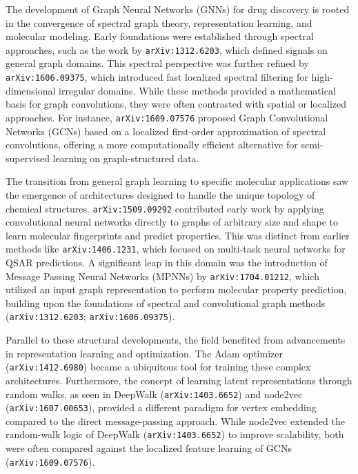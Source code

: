 \documentclass[11pt]{article}
\begin{document}
The development of Graph Neural Networks (GNNs) for drug discovery is rooted in the convergence of spectral graph theory, representation learning, and molecular modeling. Early foundations were established through spectral approaches, such as the work by \texttt{arXiv:1312.6203}, which defined signals on general graph domains. This spectral perspective was further refined by \texttt{arXiv:1606.09375}, which introduced fast localized spectral filtering for high-dimensional irregular domains. While these methods provided a mathematical basis for graph convolutions, they were often contrasted with spatial or localized approaches. For instance, \texttt{arXiv:1609.07576} proposed Graph Convolutional Networks (GCNs) based on a localized first-order approximation of spectral convolutions, offering a more computationally efficient alternative for semi-supervised learning on graph-structured data.

The transition from general graph learning to specific molecular applications saw the emergence of architectures designed to handle the unique topology of chemical structures. \texttt{arXiv:1509.09292} contributed early work by applying convolutional neural networks directly to graphs of arbitrary size and shape to learn molecular fingerprints and predict properties. This was distinct from earlier methods like \texttt{arXiv:1406.1231}, which focused on multi-task neural networks for QSAR predictions. A significant leap in this domain was the introduction of Message Passing Neural Networks (MPNNs) by \texttt{arXiv:1704.01212}, which utilized an input graph representation to perform molecular property prediction, building upon the foundations of spectral and convolutional graph methods (\texttt{arXiv:1312.6203}; \texttt{arXiv:1606.09375}).

Parallel to these structural developments, the field benefited from advancements in representation learning and optimization. The Adam optimizer (\texttt{arXiv:1412.6980}) became a ubiquitous tool for training these complex architectures. Furthermore, the concept of learning latent representations through random walks, as seen in DeepWalk (\texttt{arXiv:1403.6652}) and node2vec (\texttt{arXiv:1607.00653}), provided a different paradigm for vertex embedding compared to the direct message-passing approach. While node2vec extended the random-walk logic of DeepWalk (\texttt{arXiv:1403.6652}) to improve scalability, both were often compared against the localized feature learning of GCNs (\texttt{arXiv:1609.07576}).
\end{document}
